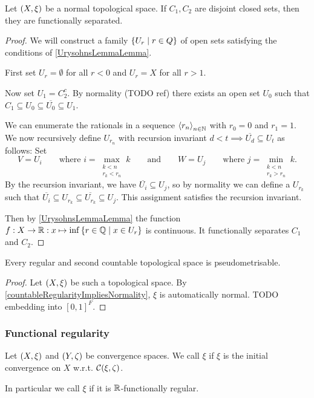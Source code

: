 \begin{theorem}
Let $\left( X,\xi \right)$ be a normal topological space. If $C_1,C_2$ are disjoint closed sets, then they are functionally separated.
\end{theorem}
\begin{proof}
We will construct a family $\left\{ U_r \;\middle|\; r\in Q \right\}$ of open sets satisfying the conditions of \ref{UrysohnsLemmaLemma}.

First set $U_r = \emptyset$ for all $r<0$ and $U_r = X$ for all $r>1$.

Now set $U_1 = C_2^c$. By normality (TODO ref) there exists an open set $U_0$ such that $C_1 \subseteq U_0 \subseteq \overline{U_0} \subseteq U_1$.

We can enumerate the rationals in a sequence $\left\langle r_n \right\rangle_{n\in \mathbb{N}}$ with $r_0 = 0$ and $r_1 = 1$. We now recursively define $U_{r_n}$ with recursion invariant $d < t \implies \overline{U_d}\subseteq U_t$ as follows: Set
\[ V =  U_i \qquad \text{where $i = \max_{\substack{k < n \\ r_k < r_n}}k$} \qquad\text{and}\qquad W = U_j \qquad \text{where $j = \min_{\substack{k < n \\ r_k > r_n}}k$}. \]
By the recursion invariant, we have $\overline{U_i}\subseteq U_j$, so by normality we can define a $U_{r_k}$ such that $\overline{U_i} \subseteq U_{r_k} \subseteq \overline{U_{r_k}} \subseteq U_j$. This assignment satisfies the recursion invariant.

Then by \ref{UrysohnsLemmaLemma} the function $f: X\to \mathbb{R}: x\mapsto \inf\left\{ r\in \mathbb{Q} \;\middle|\; x\in U_r \right\}$ is continuous. It functionally separates $C_1$ and $C_2$.
\end{proof}

\begin{corollary}
Every regular and second countable topological space is pseudometrisable.
\end{corollary}
\begin{proof}
Let $\left( X,\xi \right)$ be such a topological space. By \ref{countableRegularityImpliesNormality}, $\xi$ is automatically normal. TODO embedding into $[0,1]^F$.
\end{proof}



\subsubsection{Functional regularity}
\begin{definition}
Let $\left( X, \xi \right)$ and $\left( Y,\zeta \right)$ be convergence spaces. We call $\xi$  if $\xi$ is the initial convergence on $X$ w.r.t. $\operatorname{\mathcal{C}}(\xi,\zeta)$.

In particular we call $\xi$  if it is $\mathbb{R}$-functionally regular.
\end{definition}



